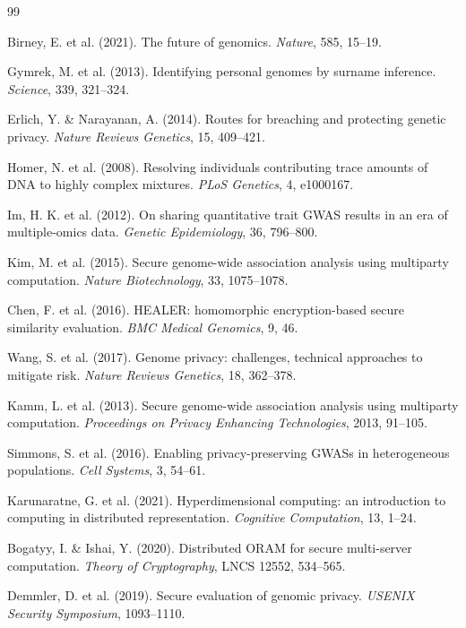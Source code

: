 \documentclass[11pt,letterpaper]{article}
\begin{document}
\begin{thebibliography}{99}

 Birney, E. et al. (2021). The future of genomics. \textit{Nature}, 585, 15--19.

 Gymrek, M. et al. (2013). Identifying personal genomes by surname inference. \textit{Science}, 339, 321--324.

 Erlich, Y. \& Narayanan, A. (2014). Routes for breaching and protecting genetic privacy. \textit{Nature Reviews Genetics}, 15, 409--421.

 Homer, N. et al. (2008). Resolving individuals contributing trace amounts of DNA to highly complex mixtures. \textit{PLoS Genetics}, 4, e1000167.

 Im, H. K. et al. (2012). On sharing quantitative trait GWAS results in an era of multiple-omics data. \textit{Genetic Epidemiology}, 36, 796--800.

 Kim, M. et al. (2015). Secure genome-wide association analysis using multiparty computation. \textit{Nature Biotechnology}, 33, 1075--1078.

 Chen, F. et al. (2016). HEALER: homomorphic encryption-based secure similarity evaluation. \textit{BMC Medical Genomics}, 9, 46.

 Wang, S. et al. (2017). Genome privacy: challenges, technical approaches to mitigate risk. \textit{Nature Reviews Genetics}, 18, 362--378.

 Kamm, L. et al. (2013). Secure genome-wide association analysis using multiparty computation. \textit{Proceedings on Privacy Enhancing Technologies}, 2013, 91--105.

 Simmons, S. et al. (2016). Enabling privacy-preserving GWASs in heterogeneous populations. \textit{Cell Systems}, 3, 54--61.

 Karunaratne, G. et al. (2021). Hyperdimensional computing: an introduction to computing in distributed representation. \textit{Cognitive Computation}, 13, 1--24.

 Bogatyy, I. \& Ishai, Y. (2020). Distributed ORAM for secure multi-server computation. \textit{Theory of Cryptography}, LNCS 12552, 534--565.

 Demmler, D. et al. (2019). Secure evaluation of genomic privacy. \textit{USENIX Security Symposium}, 1093--1110.


\end{thebibliography}
\end{document}
